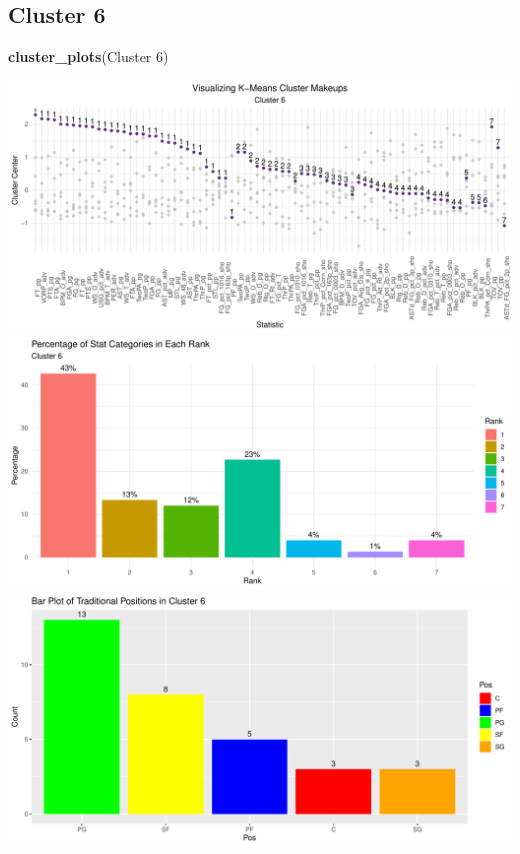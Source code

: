 \documentclass[
]{article}
\newenvironment{Shaded}{\begin{snugshade}}{\end{snugshade}}
\newcommand{\FunctionTok}[1]{\textcolor[rgb]{0.13,0.29,0.53}{\textbf{#1}}}
\newcommand{\NormalTok}[1]{#1}
\newcommand{\StringTok}[1]{\textcolor[rgb]{0.31,0.60,0.02}{#1}}
\begin{document}
\hypertarget{cluster-6}{%
\subsection{Cluster 6}\label{cluster-6}}

\begin{Shaded}
\begin{Highlighting}[]
\FunctionTok{cluster\_plots}\NormalTok{(}\StringTok{\textquotesingle{}Cluster 6\textquotesingle{}}\NormalTok{)}
\end{Highlighting}
\end{Shaded}

\includegraphics{Reclassifying-NBA-Player-Postions-Pt.-3---Clustering-Analysis-Results_files/figure-latex/unnamed-chunk-7-1.pdf}
\includegraphics{Reclassifying-NBA-Player-Postions-Pt.-3---Clustering-Analysis-Results_files/figure-latex/unnamed-chunk-7-2.pdf}
\includegraphics{Reclassifying-NBA-Player-Postions-Pt.-3---Clustering-Analysis-Results_files/figure-latex/unnamed-chunk-7-3.pdf}
\end{document}
